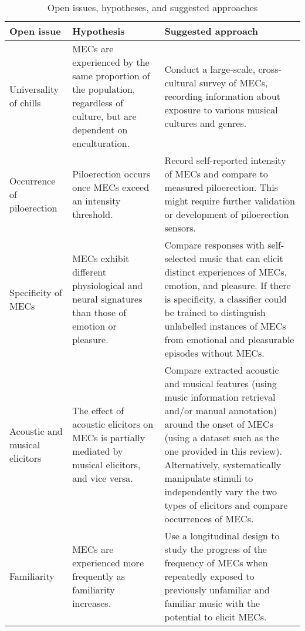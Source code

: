 \begin{table}[t!]
\centering
\tiny
\def\arraystretch{1.2}

\begin{threeparttable}
\caption{Open issues, hypotheses, and suggested approaches}
\label{tab:rev-7}

\begin{tabular*}{\textwidth}{
    >{\raggedright}p{}
    >{\raggedright}p{}
    >{\raggedright\arraybackslash}p{}}

\hline

\textbf{Open issue} & \textbf{Hypothesis} & \textbf{Suggested approach} \\ 

\hline
Universality of chills & 
    MECs are experienced by the same proportion of the population, regardless of culture, but are dependent on enculturation. &
    Conduct a large-scale, cross-cultural survey of MECs, recording information about exposure to various musical cultures and genres. \\ 

\hline
Occurrence of piloerection &
    Piloerection occurs once MECs exceed an intensity threshold. &
    Record self-reported intensity of MECs and compare to measured piloerection. This might require further validation or development of piloerection sensors. \\
  
\hline  
Specificity of MECs &
    MECs exhibit different physiological and neural signatures than those of emotion or pleasure. &
    Compare responses with self-selected music that can elicit distinct experiences of MECs, emotion, and pleasure. If there is specificity, a classifier could be trained to distinguish unlabelled instances of MECs from emotional and pleasurable episodes without MECs. \\
    
\hline 
Acoustic and musical elicitors &
    The effect of acoustic elicitors on MECs is partially mediated by musical elicitors, and vice versa. &
    Compare extracted acoustic and musical features (using music information retrieval and/or manual annotation) around the onset of MECs (using a dataset such as the one provided in this review). Alternatively, systematically manipulate stimuli to independently vary the two types of elicitors and compare occurrences of MECs. \\
    
\hline
Familiarity &
    MECs are experienced more frequently as familiarity increases. &
    Use a longitudinal design to study the progress of the frequency of MECs when repeatedly exposed to previously unfamiliar and familiar music with the potential to elicit MECs. \\
    

\end{tabular*}
\end{threeparttable}
\end{table}
